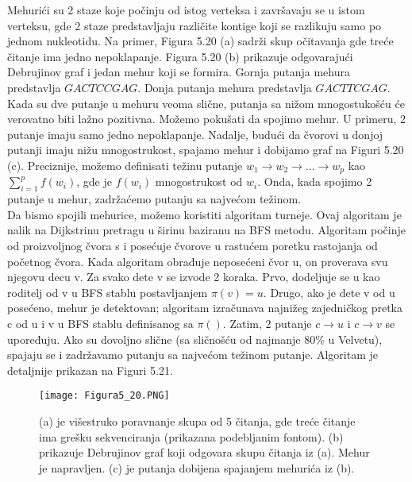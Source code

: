 \documentclass{article}
\begin{document}
Mehurići su 2 staze koje počinju od istog verteksa i završavaju se u istom verteksu, gde 2 staze predstavljaju različite kontige koji se razlikuju samo po jednom nukleotidu. Na primer, Figura 5.20 (a) sadrži skup očitavanja gde treće čitanje ima jedno nepoklapanje. Figura 5.20 (b) prikazuje odgovarajući Debrujinov graf i jedan mehur koji se formira. Gornja putanja mehura predstavlja $GACTCCGAG$. Donja putanja mehura predstavlja $GACTTCGAG$. Kada su dve putanje u mehuru veoma slične, putanja sa nižom mnogostukošću će verovatno biti lažno pozitivna. Možemo pokušati da spojimo mehur. U primeru, 2 putanje imaju samo jedno nepoklapanje. Nadalje, budući da čvorovi u donjoj putanji imaju nižu mnogostrukost, spajamo mehur i dobijamo graf na Figuri 5.20 (c). Preciznije, možemo definisati težinu putanje $w_1 \rightarrow w_2 \rightarrow ... \rightarrow w_p$ kao $\sum_{i=1}^{p} f(w_i)$, gde je $f(w_i)$ mnogostrukost od $w_i$. Onda, kada spojimo 2 putanje u mehur, zadržaćemo putanju sa najvećom težinom. \\

Da bismo spojili mehurice, možemo koristiti algoritam turneje. Ovaj algoritam je nalik na Dijkstrinu pretragu u širinu baziranu na BFS metodu. Algoritam počinje od proizvoljnog čvora s i posećuje čvorove u rastućem poretku rastojanja od početnog čvora. Kada algoritam obrađuje neposećeni čvor u, on proverava svu njegovu decu v. Za svako dete v se izvode 2 koraka. Prvo, dodeljuje se u kao roditelj od v u BFS stablu postavljanjem $\pi (v) = u$. Drugo, ako je dete v od u posećeno, mehur je detektovan; algoritam izračunava najnižeg zajedničkog pretka c od u i v u BFS stablu definisanog sa $\pi ()$. Zatim, 2 putanje $c \rightarrow u$ i $c \rightarrow v$ se upoređuju. Ako su dovoljno slične (sa sličnošću od najmanje $80\%$ u Velvetu), spajaju se  i zadržavamo putanju sa najvećom težinom putanje. Algoritam je detaljnije prikazan na Figuri 5.21.\\

\begin{figure}[h]
\centering
\texttt{[image: Figura5\_20.PNG]}
\caption{(a) je višestruko poravnanje skupa od 5 čitanja, gde treće čitanje ima grešku sekvenciranja (prikazana podebljanim fontom). (b) prikazuje Debrujinov graf koji odgovara skupu čitanja iz (a). Mehur je napravljen. (c) je putanja dobijena spajanjem mehurića iz (b).}
\end{figure}
\end{document}
